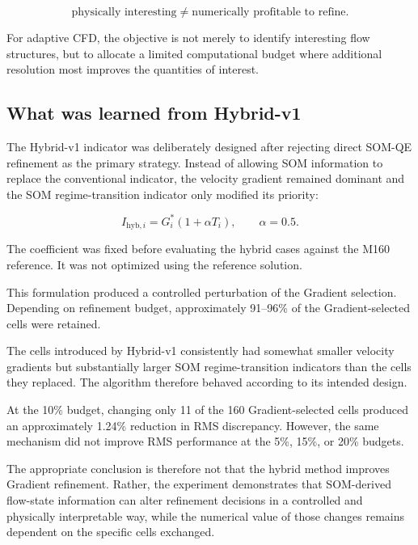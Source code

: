 \begin{equation}
\text{physically interesting}
\neq
\text{numerically profitable to refine}.
\end{equation}

For adaptive CFD, the objective is not merely to identify interesting flow
structures, but to allocate a limited computational budget where additional
resolution most improves the quantities of interest.

\subsection{What was learned from Hybrid-v1}

The Hybrid-v1 indicator was deliberately designed after rejecting direct
SOM-QE refinement as the primary strategy. Instead of allowing SOM
information to replace the conventional indicator, the velocity gradient
remained dominant and the SOM regime-transition indicator only modified its
priority:

\begin{equation}
I_{\mathrm{hyb},i}
=
G_i^{*}
\left(
1+\alpha T_i
\right),
\qquad
\alpha=0.5.
\end{equation}

The coefficient was fixed before evaluating the hybrid cases against the
M160 reference. It was not optimized using the reference solution.

This formulation produced a controlled perturbation of the Gradient
selection. Depending on refinement budget, approximately 91--96\% of the
Gradient-selected cells were retained.

The cells introduced by Hybrid-v1 consistently had somewhat smaller velocity
gradients but substantially larger SOM regime-transition indicators than the
cells they replaced. The algorithm therefore behaved according to its
intended design.

At the 10\% budget, changing only 11 of the 160 Gradient-selected cells
produced an approximately 1.24\% reduction in RMS discrepancy. However, the
same mechanism did not improve RMS performance at the 5\%, 15\%, or 20\%
budgets.

The appropriate conclusion is therefore not that the hybrid method improves
Gradient refinement. Rather, the experiment demonstrates that SOM-derived
flow-state information can alter refinement decisions in a controlled and
physically interpretable way, while the numerical value of those changes
remains dependent on the specific cells exchanged.

